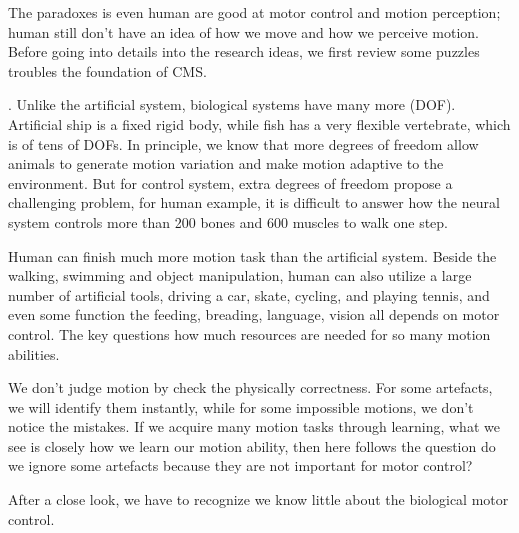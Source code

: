 The paradoxes is even human are good at motor control and motion perception; human still don’t have an idea of how we move and how we perceive motion.
Before going into details into the research ideas, we first review some puzzles troubles the foundation of CMS. 
\begin{itemize}
. Unlike the artificial system, biological systems have many more (DOF). Artificial ship is a fixed rigid body, while fish has a very flexible vertebrate, which is of tens of DOFs. In principle, we know that more degrees of freedom allow animals to generate motion variation and make motion adaptive to the environment. But for control system, extra degrees of freedom propose a challenging problem, for human example, it is difficult to answer how the neural  system controls more than 200 bones and 600 muscles to walk one step.
 
Human can finish much more motion task than the artificial system.
Beside the walking, swimming and object manipulation, human can also utilize a large number of artificial tools, driving a car, skate, cycling, and playing tennis, and even some function the feeding, breading, language, vision all depends on motor control. 
The key questions how much resources are needed for so many motion abilities.

We don’t judge motion by check the physically correctness.
For some artefacts, we will identify them instantly, while for some impossible motions, we don’t notice the mistakes. 
If we acquire many motion tasks through learning, what we see is closely how we learn our motion ability, then here follows the  question do we ignore some artefacts because they are not important for motor control?
\end{itemize}
After a close look, we have to recognize we know little about the biological motor control.

